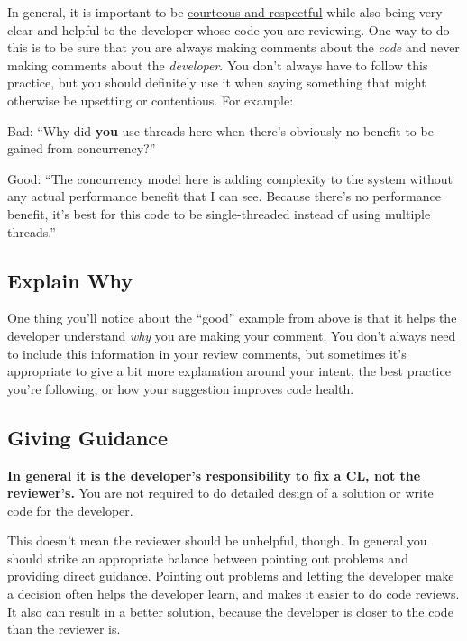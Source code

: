 \documentclass[
]{article}
\begin{document}
In general, it is important to be
\href{https://chromium.googlesource.com/chromium/src/+/master/docs/cr_respect.md}{courteous
and respectful} while also being very clear and helpful to the developer
whose code you are reviewing. One way to do this is to be sure that you
are always making comments about the \emph{code} and never making
comments about the \emph{developer}. You don't always have to follow
this practice, but you should definitely use it when saying something
that might otherwise be upsetting or contentious. For example:

Bad: ``Why did \textbf{you} use threads here when there's obviously no
benefit to be gained from concurrency?''

Good: ``The concurrency model here is adding complexity to the system
without any actual performance benefit that I can see. Because there's
no performance benefit, it's best for this code to be single-threaded
instead of using multiple threads.''

\subsection{Explain Why}\label{why}

One thing you'll notice about the ``good'' example from above is that it
helps the developer understand \emph{why} you are making your comment.
You don't always need to include this information in your review
comments, but sometimes it's appropriate to give a bit more explanation
around your intent, the best practice you're following, or how your
suggestion improves code health.

\subsection{Giving Guidance}\label{guidance}

\textbf{In general it is the developer's responsibility to fix a CL, not
the reviewer's.} You are not required to do detailed design of a
solution or write code for the developer.

This doesn't mean the reviewer should be unhelpful, though. In general
you should strike an appropriate balance between pointing out problems
and providing direct guidance. Pointing out problems and letting the
developer make a decision often helps the developer learn, and makes it
easier to do code reviews. It also can result in a better solution,
because the developer is closer to the code than the reviewer is.
\end{document}
